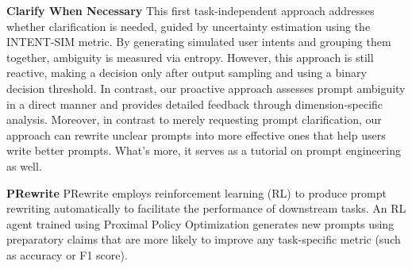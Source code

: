 \documentclass[11pt,a4paper]{article}
\begin{document}
\textbf{Clarify When Necessary} \cite{zhang2023clarifynecessaryresolvingambiguity}
This first task-independent approach addresses whether clarification is needed, guided by uncertainty estimation using the INTENT-SIM metric. By generating simulated user intents and grouping them together, ambiguity is measured via entropy. However, this approach is still reactive, making a decision only after output sampling and using a binary decision threshold. In contrast, our proactive approach assesses prompt ambiguity in a direct manner and provides detailed feedback through dimension-specific analysis. Moreover, in contrast to merely requesting prompt clarification, our approach can rewrite unclear prompts into more effective ones that help users write better prompts. What’s more, it serves as a tutorial on prompt engineering as well.

\textbf{PRewrite} \cite{kong2024prewritepromptrewritingreinforcement}
PRewrite employs reinforcement learning (RL) to produce prompt rewriting automatically to facilitate the performance of downstream tasks. An RL agent trained using Proximal Policy Optimization generates new prompts using preparatory claims that are more likely to improve any task-specific metric (such as accuracy or F1 score).
\end{document}
